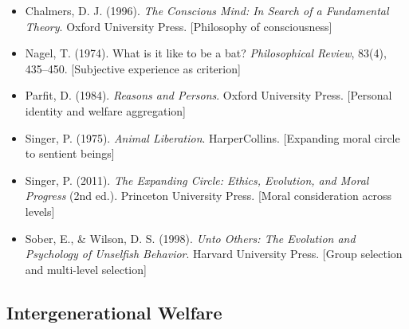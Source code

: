 \begin{itemize}

\item Chalmers, D. J. (1996). 
\textit{The Conscious Mind: In Search of a Fundamental Theory}. 
Oxford University Press.
[Philosophy of consciousness]

\item Nagel, T. (1974). 
What is it like to be a bat? 
\textit{Philosophical Review}, 83(4), 435--450.
[Subjective experience as criterion]

\item Parfit, D. (1984). 
\textit{Reasons and Persons}. 
Oxford University Press.
[Personal identity and welfare aggregation]

\item Singer, P. (1975). 
\textit{Animal Liberation}. 
HarperCollins.
[Expanding moral circle to sentient beings]

\item Singer, P. (2011). 
\textit{The Expanding Circle: Ethics, Evolution, and Moral Progress} (2nd ed.). 
Princeton University Press.
[Moral consideration across levels]

\item Sober, E., \& Wilson, D. S. (1998). 
\textit{Unto Others: The Evolution and Psychology of Unselfish Behavior}. 
Harvard University Press.
[Group selection and multi-level selection]

\end{itemize}

\subsection*{Intergenerational Welfare}

